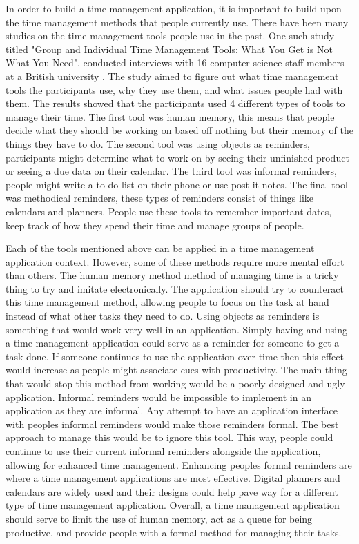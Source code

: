 \documentclass[sigconf]{acmart}
\begin{document}
    In order to build a time management application, it is important to build upon the time management methods that people currently use. There have been many studies on the time management tools people use in the past. One such study titled "Group and Individual Time Management Tools: What You Get is Not What You Need", conducted interviews with 16 computer science staff members at a British university \cite{tools}. The study aimed to figure out what time management tools the participants use, why they use them, and what issues people had with them. The results showed that the participants used 4 different types of tools to manage their time. The first tool was human memory, this means that people decide what they should be working on based off nothing but their memory of the things they have to do. The second tool was using objects as reminders, participants might determine what to work on by seeing their unfinished product or seeing a due data on their calendar. The third tool was informal reminders, people might write a to-do list on their phone or use post it notes. The final tool was methodical reminders, these types of reminders consist of things like calendars and planners. People use these tools to remember important dates, keep track of how they spend their time and manage groups of people. 

    Each of the tools mentioned above can be applied in a time management application context. However, some of these methods require more mental effort than others. The human memory method method of managing time is a tricky thing to try and imitate electronically. The application should try to counteract this time management method, allowing people to focus on the task at hand instead of what other tasks they need to do. Using objects as reminders is something that would work very well in an application. Simply having and using a time management application could serve as a reminder for someone to get a task done. If someone continues to use the application over time then this effect would increase as people might associate cues with productivity. The main thing that would stop this method from working would be a poorly designed and ugly application. Informal reminders would be impossible to implement in an application as they are informal. Any attempt to have an application interface with peoples informal reminders would make those reminders formal. The best approach to manage this would be to ignore this tool. This way, people could continue to use their current informal reminders alongside the application, allowing for enhanced time management. Enhancing peoples formal reminders are where a time management applications are most effective. Digital planners and calendars are widely used and their designs could help pave way for a different type of time management application. Overall, a time management application should serve to limit the use of human memory, act as a queue for being productive, and provide people with a formal method for managing their tasks.
\end{document}
